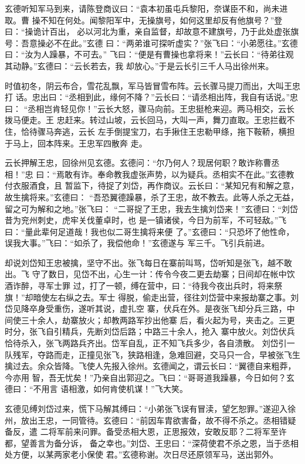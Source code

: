 玄德听知军马到来，请陈登商议曰：“袁本初虽屯兵黎阳，奈谋臣不和，尚未进取。曹
操不知在何处。闻黎阳军中，无操旗号，如何这里却反有他旗号？”登曰：“操诡计百出，
必以河北为重，亲自监督，却故意不建旗号，乃于此处虚张旗号：吾意操必不在此。”玄德
曰：“两弟谁可探听虚实？”张飞曰：“小弟愿往。”玄德曰：“汝为人躁暴，不可去。”
飞曰：“便是有曹操也拿将来！”云长曰：“待弟往观其动静。”玄德曰：“云长若去，我
却放心。”于是云长引三千人马出徐州来。

时值初冬，阴云布合，雪花乱飘，军马皆冒雪布阵。云长骤马提刀而出，大叫王忠打
话。忠出曰：“丞相到此，缘何不降？”云长曰：“请丞相出阵，我自有话说。”忠曰：
“丞相岂肯轻见你！”云长大怒，骤马向前。王忠挺枪来迎。两马相交，云长拨马便走。王
忠赶来。转过山坡，云长回马，大叫一声，舞刀直取。王忠拦截不住，恰待骤马奔逃，云长
左手倒提宝刀，右手揪住王忠勒甲绦，拖下鞍鞒，横担于马上，回本阵来。王忠军四散奔
走。

云长押解王忠，回徐州见玄德。玄德问：“尔乃何人？现居何职？敢诈称曹丞相！”忠
曰：“焉敢有诈。奉命教我虚张声势，以为疑兵。丞相实不在此。”玄德教付衣服酒食，且
暂监下，待捉了刘岱，再作商议。云长曰：“某知兄有和解之意，故生擒将来。”玄德曰：
“吾恐翼德躁暴，杀了王忠，故不教去。此等人杀之无益，留之可为解和之地。”张飞曰：
“二哥捉了王忠，我去生擒刘岱来！”玄德曰：“刘岱昔为兖州刺史，虎牢关伐董卓时，也
是一镇诸侯，今日为前军，不可轻敌。”飞曰：“量此辈何足道哉！我也似二哥生擒将来便
了。”玄德曰：“只恐坏了他性命，误我大事。”飞曰：“如杀了，我偿他命！”玄德遂与
军三千。飞引兵前进。

却说刘岱知王忠被擒，坚守不出。张飞每日在寨前叫骂，岱听知是张飞，越不敢出。飞
守了数日，见岱不出，心生一计：传令今夜二更去劫寨；日间却在帐中饮酒诈醉，寻军士罪
过，打了一顿，缚在营中，曰：“待我今夜出兵时，将来祭旗！”却暗使左右纵之去。军士
得脱，偷走出营，径往刘岱营中来报劫寨之事。刘岱见降卒身受重伤，遂听其说，虚扎空
寨，伏兵在外。是夜张飞却分兵三路，中间使三十余人，劫寨放火；却教两路军抄出他寨
后，看火起为号，夹击之。三更时分，张飞自引精兵，先断刘岱后路；中路三十余人，抢入
寨中放火。刘岱伏兵恰待杀入，张飞两路兵齐出。岱军自乱，正不知飞兵多少，各自溃散。
刘岱引一队残军，夺路而走，正撞见张飞，狭路相逢，急难回避，交马只一合，早被张飞生
擒过去。余众皆降。飞使人先报入徐州。玄德闻之，谓云长曰：“翼德自来粗莽，今亦用
智，吾无忧矣！”乃亲自出郭迎之。飞曰：“哥哥道我躁暴，今日如何？玄德曰：“不用言
语相激，如何肯使机谋！”飞大笑。

玄德见缚刘岱过来，慌下马解其缚曰：“小弟张飞误有冒渎，望乞恕罪。”遂迎入徐
州，放出王忠，一同管待。玄德曰：“前因车胄欲害备，故不得不杀之。丞相错疑备反，遣
二将军前来问罪。备受丞相大恩，正思报效，安敢反耶？二将军至许都，望善言为备分诉，
备之幸也。”刘岱、王忠曰：“深荷使君不杀之恩，当于丞相处方便，以某两家老小保使
君。”玄德称谢。次日尽还原领军马，送出郭外。

